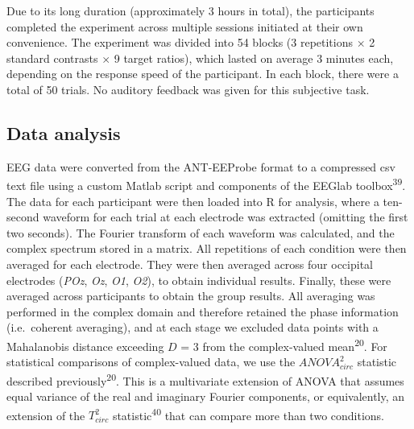 \documentclass[
]{article}
\begin{document}
Due to its long duration (approximately 3 hours in total), the participants completed the experiment across multiple sessions initiated at their own convenience. The experiment was divided into 54 blocks (3 repetitions \(\times\) 2 standard contrasts \(\times\) 9 target ratios), which lasted on average 3 minutes each, depending on the response speed of the participant. In each block, there were a total of 50 trials. No auditory feedback was given for this subjective task.

\hypertarget{data-analysis}{%
\subsection{Data analysis}\label{data-analysis}}

EEG data were converted from the ANT-EEProbe format to a compressed csv text file using a custom Matlab script and components of the EEGlab toolbox\textsuperscript{39}. The data for each participant were then loaded into R for analysis, where a ten-second waveform for each trial at each electrode was extracted (omitting the first two seconds). The Fourier transform of each waveform was calculated, and the complex spectrum stored in a matrix. All repetitions of each condition were then averaged for each electrode. They were then averaged across four occipital electrodes (\emph{POz}, \emph{Oz}, \emph{O1}, \emph{O2}), to obtain individual results. Finally, these were averaged across participants to obtain the group results. All averaging was performed in the complex domain and therefore retained the phase information (i.e.~coherent averaging), and at each stage we excluded data points with a Mahalanobis distance exceeding \(D\) = 3 from the complex-valued mean\textsuperscript{20}. For statistical comparisons of complex-valued data, we use the \(ANOVA^2_{circ}\) statistic described previously\textsuperscript{20}. This is a multivariate extension of ANOVA that assumes equal variance of the real and imaginary Fourier components, or equivalently, an extension of the \(T^2_{circ}\) statistic\textsuperscript{40} that can compare more than two conditions.
\end{document}
